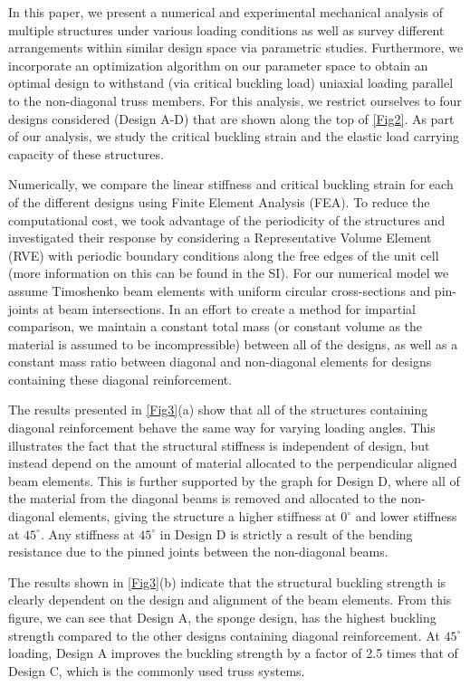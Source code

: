 \documentclass[10pt,twocolumn,twoside]{fernandes_paper}
\begin{document}
In this paper, we present a numerical and experimental mechanical analysis of multiple  structures under various loading conditions as well as survey different arrangements within similar design space via parametric studies. Furthermore, we incorporate an optimization algorithm on our parameter space to obtain an optimal design to withstand (via critical buckling load) uniaxial loading parallel to the non-diagonal truss members. For this analysis, we restrict ourselves to four designs considered (Design A-D) that are shown along the top of \cref{Fig2}. As part of our analysis, we study the critical buckling strain and the elastic load carrying capacity of these structures. 

Numerically, we compare the linear stiffness and critical buckling strain for each of the different designs using Finite Element Analysis (FEA). To reduce the computational cost, we took advantage of the periodicity of the structures and investigated their response  by considering a Representative Volume Element (RVE) with periodic boundary conditions along the free edges of the unit cell (more information on this can be found in the SI). For our numerical model we assume Timoshenko beam elements with uniform circular cross-sections and pin-joints at beam intersections. In an effort to create a method for impartial comparison, we maintain a constant total mass (or constant volume as the material is assumed to be incompressible) between all of the designs, as well as a constant mass ratio between diagonal and non-diagonal elements for designs containing these diagonal reinforcement. 

The results presented in \cref{Fig3}(a) show that all of the structures containing diagonal reinforcement behave the same way for varying loading angles. This illustrates the fact that the structural stiffness is independent of design, but instead depend on the amount of material allocated to the perpendicular aligned beam elements. This is further supported by the graph for Design D, where all of the material from the diagonal beams is removed and allocated to the non-diagonal elements, giving the structure a higher stiffness at $0^\circ$ and lower stiffness at $45^\circ$. Any stiffness at $45^\circ$ in Design D is strictly a result of the bending resistance due to the pinned joints between the non-diagonal beams.

The results shown in \cref{Fig3}(b) indicate that the structural buckling strength is clearly dependent on the design and alignment of the beam elements. From this figure, we can see that Design A, the sponge design, has the highest buckling strength compared to the other designs containing diagonal reinforcement. At $45^\circ$ loading, Design A improves the buckling strength by a factor of 2.5 times that of Design C, which is the commonly used truss systems. 
\end{document}
